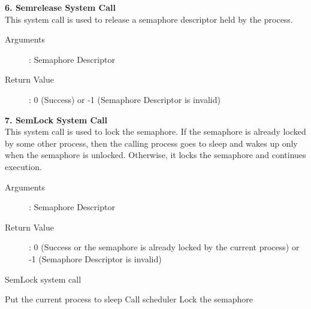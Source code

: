 \documentclass[11pt ,twosided]{article}
\begin{document}

\textbf{6. Semrelease System Call}
\\
This system call is used to release a semaphore descriptor held by the process.  
\begin{description}
\item[Arguments]: Semaphore Descriptor
\item[Return Value]: 0 (Success) or -1 (Semaphore Descriptor is invalid) 
\end{description} 

\textbf{7. SemLock System Call}
\\
This system call is used to lock the semaphore. If the semaphore is already locked by some other process, then the calling process goes to sleep and wakes up only when the semaphore is unlocked. Otherwise, it locks the semaphore and continues execution. 
\begin{description}
\item[Arguments]: Semaphore Descriptor
\item[Return Value]: 0 (Success or the semaphore is already locked by the current process) or -1 (Semaphore Descriptor is invalid)
\end{description} 
\iffalse
\begin{algorithm}
\caption{SemLock system call}
\begin{algorithmic}
\ENDIF
{}
\ENDIF
{}
            \STATE Put the current process to sleep
            \STATE Call scheduler
        \ENDWHILE
    \ENDIF
\ENDIF
\STATE Lock the semaphore
\end{algorithmic}
\end{algorithm}
\end{document}
